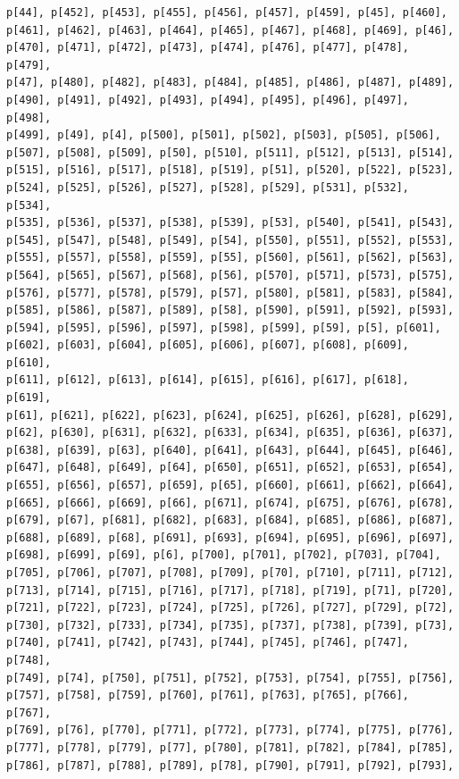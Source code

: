 \documentclass[
  letterpaper,
  DIV=11,
  numbers=noendperiod]{scrartcl}
\begin{document}
\begin{verbatim}
p[44], p[452], p[453], p[455], p[456], p[457], p[459], p[45], p[460],
p[461], p[462], p[463], p[464], p[465], p[467], p[468], p[469], p[46],
p[470], p[471], p[472], p[473], p[474], p[476], p[477], p[478], p[479],
p[47], p[480], p[482], p[483], p[484], p[485], p[486], p[487], p[489],
p[490], p[491], p[492], p[493], p[494], p[495], p[496], p[497], p[498],
p[499], p[49], p[4], p[500], p[501], p[502], p[503], p[505], p[506],
p[507], p[508], p[509], p[50], p[510], p[511], p[512], p[513], p[514],
p[515], p[516], p[517], p[518], p[519], p[51], p[520], p[522], p[523],
p[524], p[525], p[526], p[527], p[528], p[529], p[531], p[532], p[534],
p[535], p[536], p[537], p[538], p[539], p[53], p[540], p[541], p[543],
p[545], p[547], p[548], p[549], p[54], p[550], p[551], p[552], p[553],
p[555], p[557], p[558], p[559], p[55], p[560], p[561], p[562], p[563],
p[564], p[565], p[567], p[568], p[56], p[570], p[571], p[573], p[575],
p[576], p[577], p[578], p[579], p[57], p[580], p[581], p[583], p[584],
p[585], p[586], p[587], p[589], p[58], p[590], p[591], p[592], p[593],
p[594], p[595], p[596], p[597], p[598], p[599], p[59], p[5], p[601],
p[602], p[603], p[604], p[605], p[606], p[607], p[608], p[609], p[610],
p[611], p[612], p[613], p[614], p[615], p[616], p[617], p[618], p[619],
p[61], p[621], p[622], p[623], p[624], p[625], p[626], p[628], p[629],
p[62], p[630], p[631], p[632], p[633], p[634], p[635], p[636], p[637],
p[638], p[639], p[63], p[640], p[641], p[643], p[644], p[645], p[646],
p[647], p[648], p[649], p[64], p[650], p[651], p[652], p[653], p[654],
p[655], p[656], p[657], p[659], p[65], p[660], p[661], p[662], p[664],
p[665], p[666], p[669], p[66], p[671], p[674], p[675], p[676], p[678],
p[679], p[67], p[681], p[682], p[683], p[684], p[685], p[686], p[687],
p[688], p[689], p[68], p[691], p[693], p[694], p[695], p[696], p[697],
p[698], p[699], p[69], p[6], p[700], p[701], p[702], p[703], p[704],
p[705], p[706], p[707], p[708], p[709], p[70], p[710], p[711], p[712],
p[713], p[714], p[715], p[716], p[717], p[718], p[719], p[71], p[720],
p[721], p[722], p[723], p[724], p[725], p[726], p[727], p[729], p[72],
p[730], p[732], p[733], p[734], p[735], p[737], p[738], p[739], p[73],
p[740], p[741], p[742], p[743], p[744], p[745], p[746], p[747], p[748],
p[749], p[74], p[750], p[751], p[752], p[753], p[754], p[755], p[756],
p[757], p[758], p[759], p[760], p[761], p[763], p[765], p[766], p[767],
p[769], p[76], p[770], p[771], p[772], p[773], p[774], p[775], p[776],
p[777], p[778], p[779], p[77], p[780], p[781], p[782], p[784], p[785],
p[786], p[787], p[788], p[789], p[78], p[790], p[791], p[792], p[793],

\end{verbatim}
\end{document}
